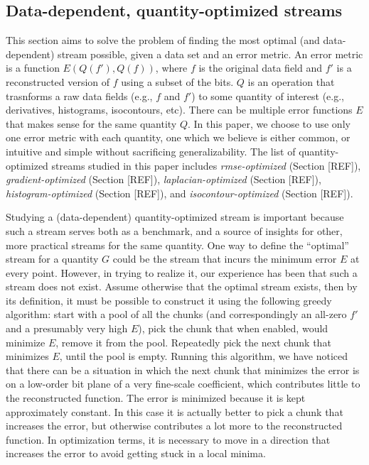 \subsection{Data-dependent, quantity-optimized streams}
\label{sec:data_dep_streams}

This section aims to solve the problem of finding the most optimal (and data-dependent) stream
possible, given a data set and an error metric. An error metric is a function $E(Q(f'),Q(f))$, where
$f$ is the original data field and $f'$ is a reconstructed version of $f$ using a subset of the
bits. $Q$ is an operation that trasnforms a raw data fields (e.g., $f$ and $f'$) to some quantity of
interest (e.g., derivatives, histograms, isocontours, etc). There can be multiple error functions
$E$ that makes sense for the same quantity $Q$. In this paper, we choose to use only one error
metric with each quantity, one which we believe is either common, or intuitive and simple without
sacrificing generalizability. The list of quantity-optimized streams studied in this paper includes
\emph{rmse-optimized} (Section [REF]), \emph{gradient-optimized} (Section [REF]),
\emph{laplacian-optimized} (Section [REF]), \emph{histogram-optimized} (Section [REF]), and
\emph{isocontour-optimized} (Section [REF]).

Studying a (data-dependent) quantity-optimized stream is important because such a stream serves both
as a benchmark, and a source of insights for other, more practical streams for the same quantity.
One way to define the ``optimal'' stream for a quantity $G$ could be the stream that incurs the
minimum error $E$ at every point. However, in trying to realize it, our experience has been that
such a stream does not exist. Assume otherwise that the optimal stream exists, then by its
definition, it must be possible to construct it using the following greedy algorithm: start with a
pool of all the chunks (and correspondingly an all-zero $f'$ and a presumably very high $E$), pick
the chunk that when enabled, would minimize $E$, remove it from the pool. Repeatedly pick the next
chunk that minimizes $E$, until the pool is empty. Running this algorithm, we have noticed that
there can be a situation in which the next chunk that minimizes the error is on a low-order bit
plane of a very fine-scale coefficient, which contributes little to the reconstructed function. The
error is minimized because it is kept approximately constant. In this case it is actually better to
pick a chunk that increases the error, but otherwise contributes a lot more to the reconstructed
function. In optimization terms, it is necessary to move in a direction that increases the error to
avoid getting stuck in a local minima.

